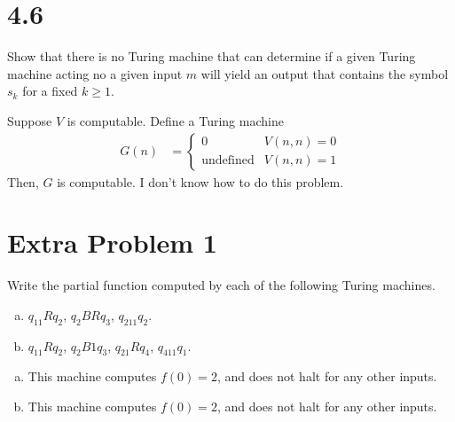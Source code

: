 \documentclass[12pt]{mypackage}
\begin{document}
\section{4.6}%
\begin{problem}
  Show that there is no Turing machine that can determine if a given Turing machine acting no a given input $m$ will yield an output that contains the symbol $s_k$ for a fixed $k\geq 1$.
\end{problem}
\begin{solution}
  Suppose $V$ is computable. Define a Turing machine
  \begin{align*}
    G\left(n\right) &= \begin{cases}
      0 & V\left(n,n\right) = 0\\
      \text{undefined} & V\left(n,n\right) = 1
    \end{cases}
  \end{align*}
  Then, $G$ is computable. I don't know how to do this problem.
\end{solution}
\section{Extra Problem 1}%
\begin{problem}
  Write the partial function computed by each of the following Turing machines.
  \begin{enumerate}[(a)]
    \item $q_11Rq_2$, $q_2BRq_3$, $q_211q_2$.
    \item $q_11Rq_2$, $q_2B1q_3$, $q_21Rq_4$, $q_411q_1$.
  \end{enumerate}
\end{problem}
\begin{solution}\hfill
  \begin{enumerate}[(a)]
    \item This machine computes $f(0) = 2$, and does not halt for any other inputs.
    \item This machine computes $f(0) = 2$, and does not halt for any other inputs.
  \end{enumerate}
\end{solution}
\end{document}
